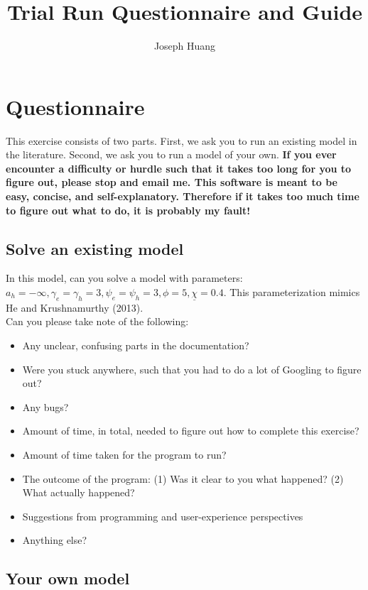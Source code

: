 \documentclass[10pt,a4paper]{article}
\title{Trial Run Questionnaire and Guide}
\author{Joseph Huang}
\date{}
\begin{document}
\maketitle
\section{Questionnaire}
This exercise consists of two parts. First, we ask you to run an existing model in the literature. Second, we ask you to run a model of your own. \textbf{If you ever encounter a difficulty or hurdle such that it takes too long for you to figure out, please stop and email me. This software is meant to be easy, concise, and self-explanatory. Therefore if it takes too much time to figure out what to do, it is probably my fault!}

\subsection{Solve an existing model}

In this model, can you solve a model with parameters: $a_h = -\infty, \gamma_e = \gamma_h = 3, \psi_e = \psi_h = 3, \phi = 5, \underline{\chi} = 0.4$. This parameterization mimics He and Krushnamurthy (2013). \\


Can you please take note of the following:
\begin{itemize}
\item Any unclear, confusing parts in the documentation?
\item Were you stuck anywhere, such that you had to do a lot of Googling to figure out?
\item Any bugs?
\item Amount of time, in total, needed to figure out how to complete this exercise?
\item Amount of time taken for the program to run?
\item The outcome of the program: (1) Was it clear to you what happened? (2) What actually happened?
\item Suggestions from programming and user-experience perspectives
\item Anything else?
\end{itemize}

\subsection{Your own model}
\end{document}
